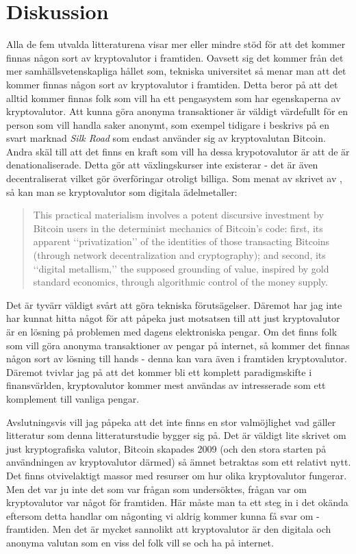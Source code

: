 \documentclass[a4paper,11pt,exjobb]{kth-mag}
\begin{document}
\section{Diskussion}
Alla de fem utvalda litteraturena visar mer eller mindre stöd för att det kommer finnas någon sort av kryptovalutor i framtiden. Oavsett sig det kommer från det mer samhällsvetenskapliga hållet som\cite{scoop1}, tekniska universitet\cite{first,scoop3,bitsc,Christ} så menar man att det kommer finnas någon sort av kryptovalutor i framtiden. Detta beror på att det alltid kommer finnas folk som vill ha ett pengasystem som har egenskaperna av kryptovalutor. Att kunna göra anonyma transaktioner är väldigt värdefullt för en person som vill handla saker anonymt, som exempel tidigare i  beskrivs på en svart marknad \textit{Silk Road} som endast använder sig av kryptovalutan Bitcoin. Andra skäl till att det finns en kraft som vill ha dessa krypotovalutor är att de är denationaliserade. Detta gör att växlingskurser inte existerar - det är även decentraliserat vilket gör överföringar otroligt billiga. Som menat av skrivet av , så kan man se kryptovalutor som digitala ädelmetaller:

\begin{quote}
This practical materialism involves a potent discursive investment by Bitcoin
users in the determinist mechanics of Bitcoin’s code: first, its apparent ‘‘privatization’’ of the identities of those transacting Bitcoins (through network decentralization and cryptography); and second, its ‘‘digital metallism,’’ the supposed grounding of value, inspired by gold standard economics, through algorithmic control of the money supply.\cite[p.262]{scoop1}
\end{quote}  

Det är tyvärr väldigt svårt att göra tekniska förutsägelser. Däremot har jag inte har kunnat hitta något för att påpeka just motsatsen till att just kryptovalutor är en lösning på problemen med dagens elektroniska pengar. Om det finns folk som vill göra anonyma transaktioner av pengar på internet, så kommer det finnas någon sort av lösning till hands - denna kan vara även i framtiden kryptovalutor. Däremot tvivlar jag på att det kommer bli ett komplett paradigmskifte i finansvärlden, kryptovalutor kommer mest användas av intresserade  som ett komplement till vanliga pengar.

Avslutningsvis vill jag påpeka att det inte finns en stor valmöjlighet vad gäller litteratur som denna litteraturstudie bygger sig på. Det är väldigt lite skrivet om just kryptografiska valutor, Bitcoin skapades 2009 (och den stora starten på användningen av kryptovalutor därmed) så ämnet betraktas som ett relativt nytt. Det finns otvivelaktigt massor med resurser om hur olika kryptovalutor fungerar. Men det var ju inte det som var frågan som undersöktes, frågan var om kryptovalutor  var något för framtiden. Här måste man ta ett steg in i det okända eftersom detta handlar om någonting vi aldrig kommer kunna få svar om - framtiden. Men det är mycket sannolikt att kryptovalutor är den digitala och anonyma valutan som en viss del folk vill se och ha på internet.
\end{document}
